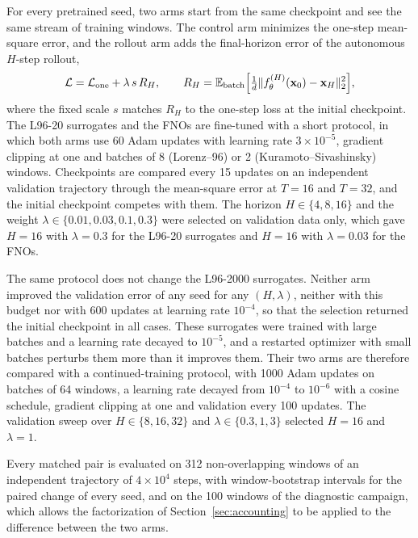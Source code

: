 For every pretrained seed, two arms start from the same checkpoint and see the same stream of training windows. The control arm minimizes the one-step mean-square error, and the rollout arm adds the final-horizon error of the autonomous $H$-step rollout,
\begin{equation}
  \mathcal L=\mathcal L_{\rm one}+\lambda\,s\,R_H,
  \qquad
  R_H=\mathbb E_{\rm batch}\Big[\tfrac1d\|f_\theta^{(H)}(\mathbf x_0)-\mathbf x_H\|_2^2\Big],
  \label{eq:rollout_loss}
\end{equation}
where the fixed scale $s$ matches $R_H$ to the one-step loss at the initial checkpoint. The L96-20 surrogates and the FNOs are fine-tuned with a short protocol, in which both arms use 60 Adam updates with learning rate $3\times10^{-5}$, gradient clipping at one and batches of 8 (Lorenz--96) or 2 (Kuramoto--Sivashinsky) windows. Checkpoints are compared every 15 updates on an independent validation trajectory through the mean-square error at $T=16$ and $T=32$, and the initial checkpoint competes with them. The horizon $H\in\{4,8,16\}$ and the weight $\lambda\in\{0.01,0.03,0.1,0.3\}$ were selected on validation data only, which gave $H=16$ with $\lambda=0.3$ for the L96-20 surrogates and $H=16$ with $\lambda=0.03$ for the FNOs.

The same protocol does not change the L96-2000 surrogates. Neither arm improved the validation error of any seed for any $(H,\lambda)$, neither with this budget nor with 600 updates at learning rate $10^{-4}$, so that the selection returned the initial checkpoint in all cases. These surrogates were trained with large batches and a learning rate decayed to $10^{-5}$, and a restarted optimizer with small batches perturbs them more than it improves them. Their two arms are therefore compared with a continued-training protocol, with 1000 Adam updates on batches of 64 windows, a learning rate decayed from $10^{-4}$ to $10^{-6}$ with a cosine schedule, gradient clipping at one and validation every 100 updates. The validation sweep over $H\in\{8,16,32\}$ and $\lambda\in\{0.3,1,3\}$ selected $H=16$ and $\lambda=1$.

Every matched pair is evaluated on 312 non-overlapping windows of an independent trajectory of $4\times10^4$ steps, with window-bootstrap intervals for the paired change of every seed, and on the 100 windows of the diagnostic campaign, which allows the factorization of Section~\ref{sec:accounting} to be applied to the difference between the two arms.
